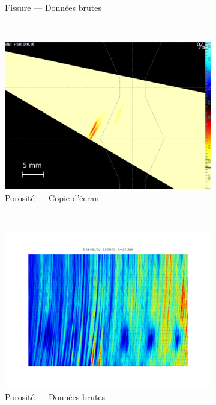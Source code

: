 \begin{figure}[!h]
\begin{subfigure}{0.55\textwidth}
\caption{Fissure --- Données brutes}
\end{subfigure}\\
\begin{subfigure}{0.43\textwidth}
\includegraphics[width=\textwidth]{me_figs/def2.png}
\caption{Porosité --- Copie d'écran}
\end{subfigure}~%
\begin{subfigure}{0.55\textwidth}
\includegraphics[width=\textwidth]{me_figs/porosity_measure.png}
\caption{Porosité --- Données brutes}
\end{subfigure}\\
\begin{subfigure}{0.43\textwidth}

\end{subfigure}
\end{figure}
